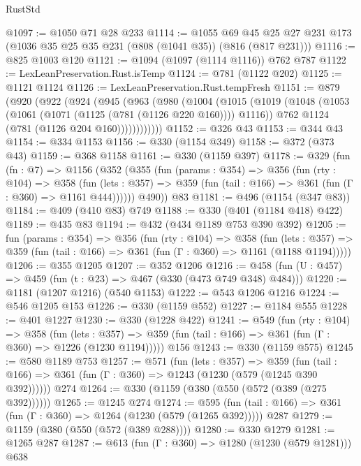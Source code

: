 \begin{lexlean}{RustStd}
\begin{coremodule}
@1097 := @1050 @71 @28 @233
@1114 := @1055
    @69
    @45
    @25
    @27
    @231
    @173
    (@1036 @35 @25 @35 @231 (@808 (@1041 @35)) (@816 (@817 @231)))
@1116 := @825 @1003 @120
@1121 := @1094 (@1097 (@1114 @1116)) @762 @787
@1122 := LexLeanPreservation.Rust.isTemp
@1124 := @781 (@1122 @202)
@1125 := @1121 @1124
@1126 := LexLeanPreservation.Rust.tempFresh
@1151 := @879
    (@920
      (@922
        (@924
          (@945
            (@963
              (@980
                (@1004
                  (@1015
                    (@1019
                      (@1048
                        (@1053 (@1061 (@1071 (@1125 (@781 (@1126 @220 @160)))) @1116))
                        @762
                        @1124
                        (@781 (@1126 @204 @160))))))))))))
@1152 := @326 @43
@1153 := @344 @43
@1154 := @334 @1153
@1156 := @330 (@1154 @349)
@1158 := @372 (@373 @43)
@1159 := @368 @1158
@1161 := @330 (@1159 @397)
@1178 := @329
    (fun (fn : @7) =>
    @1156
      (@352
        (@355
          (fun (params : @354) =>
          @356
            (fun (rty : @104) =>
            @358
              (fun (lets : @357) =>
              @359 (fun (tail : @166) => @361 (fun (Γ : @360) => @1161 @444))))))
        @490))
    @83
@1181 := @496 (@1154 (@347 @83))
@1184 := @409 (@410 @83) @749
@1188 := @330 (@401 (@1184 @418) @422)
@1189 := @435 @83
@1194 := @432 (@434 @1189 @753 @390 @392)
@1205 := fun (params : @354) =>
  @356
    (fun (rty : @104) =>
    @358
      (fun (lets : @357) =>
      @359 (fun (tail : @166) => @361 (fun (Γ : @360) => @1161 (@1188 @1194)))))
@1206 := @355 @1205
@1207 := @352 @1206
@1216 := @458 (fun (U : @457) => @459 (fun (t : @23) => @467 (@330 (@473 @749 @348) @484)))
@1220 := @1181 (@1207 @1216) (@540 @1153)
@1222 := @543 @1206 @1216
@1224 := @546 @1205 @153
@1226 := @330 (@1159 @552)
@1227 := @1184 @555
@1228 := @401 @1227
@1230 := @330 (@1228 @422)
@1241 := @549
    (fun (rty : @104) =>
    @358
      (fun (lets : @357) =>
      @359 (fun (tail : @166) => @361 (fun (Γ : @360) => @1226 (@1230 @1194)))))
    @156
@1243 := @330 (@1159 @575)
@1245 := @580 @1189 @753
@1257 := @571
    (fun (lets : @357) =>
    @359 (fun (tail : @166) => @361 (fun (Γ : @360) => @1243 (@1230 (@579 (@1245 @390 @392))))))
    @274
@1264 := @330 (@1159 (@380 (@550 (@572 (@389 (@275 @392))))))
@1265 := @1245 @274
@1274 := @595 (fun (tail : @166) => @361 (fun (Γ : @360) => @1264 (@1230 (@579 (@1265 @392))))) @287
@1279 := @1159 (@380 (@550 (@572 (@389 @288))))
@1280 := @330 @1279
@1281 := @1265 @287
@1287 := @613 (fun (Γ : @360) => @1280 (@1230 (@579 @1281))) @638

\end{coremodule}
\end{lexlean}
